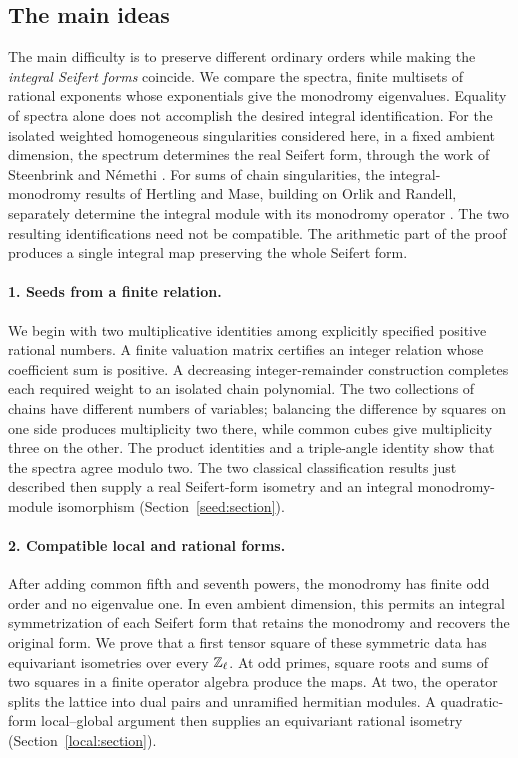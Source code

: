 \subsection*{The main ideas}

The main difficulty is to preserve different ordinary orders while
making the \emph{integral Seifert forms} coincide. We compare the
spectra, finite multisets of rational exponents whose exponentials give
the monodromy eigenvalues. Equality of spectra alone does not accomplish
the desired integral identification. For the isolated weighted homogeneous
singularities considered here, in a fixed ambient dimension, the spectrum
determines the real Seifert form, through the work of Steenbrink and
N\'emethi
\cite{Steenbrink1977,Steenbrink1989,Nemethi1995,BalnojanHertling2019}.
For sums of chain singularities, the integral-monodromy results of
Hertling and Mase, building on Orlik and Randell, separately determine
the integral module with its monodromy operator
\cite{Orlik1972,OrlikRandell1977,HertlingMase2022}.
The two resulting identifications need not be compatible. The arithmetic
part of the proof produces a single integral map preserving the whole
Seifert form.

\paragraph{1. Seeds from a finite relation.}
We begin with two multiplicative identities among explicitly specified
positive rational numbers. A finite valuation matrix certifies an
integer relation whose coefficient sum is positive. A decreasing
integer-remainder construction completes each required weight to an
isolated chain polynomial. The two collections of chains have different
numbers of variables; balancing the difference by squares on one side
produces multiplicity two there, while common cubes give multiplicity
three on the other. The product identities and a triple-angle identity
show that the spectra agree modulo two. The two classical classification
results just described then supply a real Seifert-form isometry and an
integral monodromy-module isomorphism
(Section~\ref{seed:section}).

\paragraph{2. Compatible local and rational forms.}
After adding common fifth and seventh powers, the monodromy has finite
odd order and no eigenvalue one. In even ambient dimension, this permits
an integral symmetrization of each Seifert form that retains the
monodromy and recovers the original form. We prove that a first tensor
square of these symmetric data has equivariant isometries over every
$\mathbb Z_\ell$. At odd primes, square roots and sums of two squares in a
finite operator algebra produce the maps. At two, the operator splits
the lattice into dual pairs and unramified hermitian modules. A
quadratic-form local--global argument then supplies an equivariant
rational isometry (Section~\ref{local:section}).


